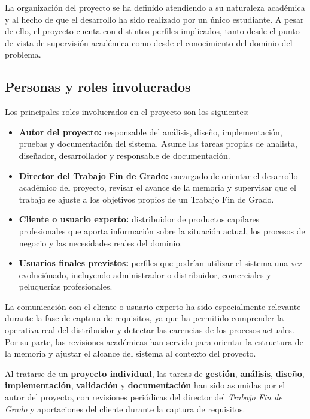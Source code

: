 La organización del proyecto se ha definido atendiendo a su naturaleza académica y al hecho de que el desarrollo ha sido realizado por un único estudiante. A pesar de ello, el proyecto cuenta con distintos perfiles implicados, tanto desde el punto de vista de supervisión académica como desde el conocimiento del dominio del problema.

\subsection{Personas y roles involucrados}

Los principales roles involucrados en el proyecto son los siguientes:

\begin{itemize}
    \item \textbf{Autor del proyecto:} responsable del análisis, diseño, implementación, pruebas y documentación del sistema. Asume las tareas propias de analista, diseñador, desarrollador y responsable de documentación.
    \item \textbf{Director del Trabajo Fin de Grado:} encargado de orientar el desarrollo académico del proyecto, revisar el avance de la memoria y supervisar que el trabajo se ajuste a los objetivos propios de un Trabajo Fin de Grado.
    \item \textbf{Cliente o usuario experto:} distribuidor de productos capilares profesionales que aporta información sobre la situación actual, los procesos de negocio y las necesidades reales del dominio.
    \item \textbf{Usuarios finales previstos:} perfiles que podrían utilizar el sistema una vez evoluciónado, incluyendo administrador o distribuidor, comerciales y peluquerías profesionales.
\end{itemize}

La comunicación con el cliente o usuario experto ha sido especialmente relevante durante la fase de captura de requisitos, ya que ha permitido comprender la operativa real del distribuidor y detectar las carencias de los procesos actuales. Por su parte, las revisiones académicas han servido para orientar la estructura de la memoria y ajustar el alcance del sistema al contexto del proyecto.

Al tratarse de un \textbf{proyecto individual}, las tareas de \textbf{gestión}, \textbf{análisis}, \textbf{diseño}, \textbf{implementación}, \textbf{validación} y \textbf{documentación} han sido asumidas por el autor del proyecto, con revisiones periódicas del director del \textit{Trabajo Fin de Grado} y aportaciones del cliente durante la captura de requisitos.

